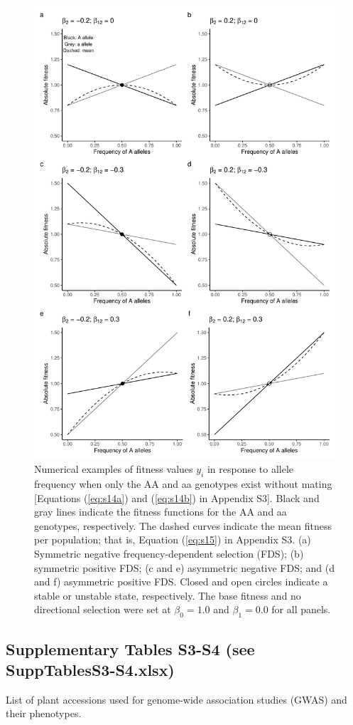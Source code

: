\documentclass[12pt,]{article}
\begin{document}
\begin{figure}[]
  \includegraphics[width=0.7\linewidth]{AsymFDSinbred.pdf}
  \caption{Numerical examples of fitness values $y_i$ in response to allele frequency when only the AA and aa genotypes exist without mating [Equations (\ref{eq:s14a}) and (\ref{eq:s14b}) in Appendix S3]. Black and gray lines indicate the fitness functions for the AA and aa genotypes, respectively. The dashed curves indicate the mean fitness per population; that is, Equation (\ref{eq:s15}) in Appendix S3. (a) Symmetric negative frequency-dependent selection (FDS); (b) symmetric positive FDS; (c and e) asymmetric negative FDS; and (d and f) asymmetric positive FDS. Closed and open circles indicate a stable or unstable state, respectively. The base fitness and no directional selection were set at $\beta_0=1.0$ and $\beta_1=0.0$ for all panels.}
  \label{figS3:FDSinbred}
\end{figure}

\newpage
\subsection*{Supplementary Tables S3-S4 (see SuppTablesS3-S4.xlsx)}

\medskip
\noindent
\begin{table}[ht]
\caption{List of plant accessions used for genome-wide association studies (GWAS) and their phenotypes.}
    \label{tableS3:GWASdata}
\end{table}
\end{document}
